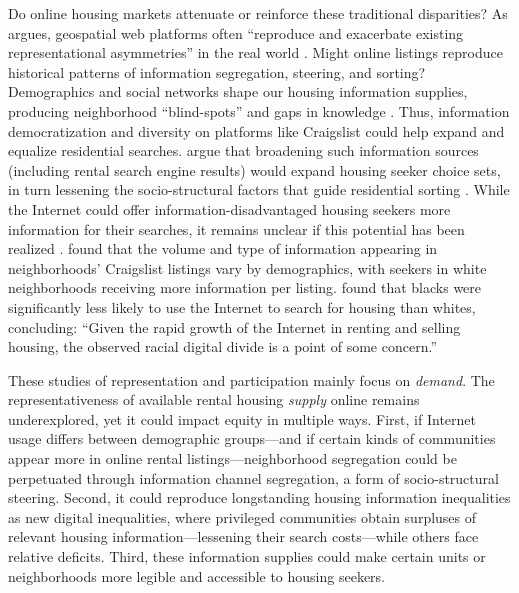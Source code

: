 \documentclass[11pt,letterpaper]{article}
\begin{document}
Do online housing markets attenuate or reinforce these traditional disparities? As \citet[][p. 993]{stephens_gender_2013} argues, geospatial web platforms often \enquote{reproduce and exacerbate existing representational asymmetries} in the real world \cite[cf.][]{elwood_geographic_2010}. Might online listings reproduce historical patterns of information segregation, steering, and sorting? Demographics and social networks shape our housing information supplies, producing neighborhood \enquote{blind-spots} and gaps in knowledge \citep{krysan_racial_2009}. Thus, information democratization and diversity on platforms like Craigslist could help expand and equalize residential searches. \citet{krysan_cycle_2017} argue that broadening such information sources (including rental search engine results) would expand housing seeker choice sets, in turn lessening the socio-structural factors that guide residential sorting \citep[cf.][]{sampson_neighborhood_2008,steil_household_2017}. While the Internet could offer information-disadvantaged housing seekers more information for their searches, it remains unclear if this potential has been realized \citep{palm_residential_2001,decker_housing_2010}. \citet{besbris_language_2018} found that the volume and type of information appearing in neighborhoods' Craigslist listings vary by demographics, with seekers in white neighborhoods receiving more information per listing. \citet[][p.~598]{krysan_does_2008} found that blacks were significantly less likely to use the Internet to search for housing than whites, concluding: \enquote{Given the rapid growth of the Internet in renting and selling housing, the observed racial digital divide is a point of some concern.}

These studies of representation and participation mainly focus on \emph{demand}. The representativeness of available rental housing \emph{supply} online remains underexplored, yet it could impact equity in multiple ways. First, if Internet usage differs between demographic groups---and if certain kinds of communities appear more in online rental listings---neighborhood segregation could be perpetuated through information channel segregation, a form of socio-structural steering. Second, it could reproduce longstanding housing information inequalities as new digital inequalities, where privileged communities obtain surpluses of relevant housing information---lessening their search costs---while others face relative deficits. Third, these information supplies could make certain units or neighborhoods more legible and accessible to housing seekers.
\end{document}
